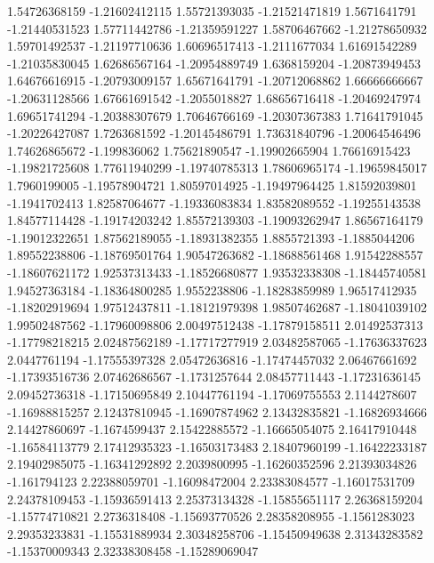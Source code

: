   1.54726368159   -1.21602412115
  1.55721393035   -1.21521471819
   1.5671641791   -1.21440531523
  1.57711442786   -1.21359591227
  1.58706467662   -1.21278650932
  1.59701492537   -1.21197710636
  1.60696517413    -1.2111677034
  1.61691542289   -1.21035830045
  1.62686567164   -1.20954889749
   1.6368159204   -1.20873949453
  1.64676616915   -1.20793009157
  1.65671641791   -1.20712068862
  1.66666666667   -1.20631128566
  1.67661691542    -1.2055018827
  1.68656716418   -1.20469247974
  1.69651741294   -1.20388307679
  1.70646766169   -1.20307367383
  1.71641791045   -1.20226427087
   1.7263681592   -1.20145486791
  1.73631840796   -1.20064546496
  1.74626865672     -1.199836062
  1.75621890547   -1.19902665904
  1.76616915423   -1.19821725608
  1.77611940299   -1.19740785313
  1.78606965174   -1.19659845017
   1.7960199005   -1.19578904721
  1.80597014925   -1.19497964425
  1.81592039801    -1.1941702413
  1.82587064677   -1.19336083834
  1.83582089552   -1.19255143538
  1.84577114428   -1.19174203242
  1.85572139303   -1.19093262947
  1.86567164179   -1.19012322651
  1.87562189055   -1.18931382355
   1.8855721393    -1.1885044206
  1.89552238806   -1.18769501764
  1.90547263682   -1.18688561468
  1.91542288557   -1.18607621172
  1.92537313433   -1.18526680877
  1.93532338308   -1.18445740581
  1.94527363184   -1.18364800285
   1.9552238806   -1.18283859989
  1.96517412935   -1.18202919694
  1.97512437811   -1.18121979398
  1.98507462687   -1.18041039102
  1.99502487562   -1.17960098806
  2.00497512438   -1.17879158511
  2.01492537313   -1.17798218215
  2.02487562189   -1.17717277919
  2.03482587065   -1.17636337623
   2.0447761194   -1.17555397328
  2.05472636816   -1.17474457032
  2.06467661692   -1.17393516736
  2.07462686567    -1.1731257644
  2.08457711443   -1.17231636145
  2.09452736318   -1.17150695849
  2.10447761194   -1.17069755553
   2.1144278607   -1.16988815257
  2.12437810945   -1.16907874962
  2.13432835821   -1.16826934666
  2.14427860697    -1.1674599437
  2.15422885572   -1.16665054075
  2.16417910448   -1.16584113779
  2.17412935323   -1.16503173483
  2.18407960199   -1.16422233187
  2.19402985075   -1.16341292892
   2.2039800995   -1.16260352596
  2.21393034826     -1.161794123
  2.22388059701   -1.16098472004
  2.23383084577   -1.16017531709
  2.24378109453   -1.15936591413
  2.25373134328   -1.15855651117
  2.26368159204   -1.15774710821
   2.2736318408   -1.15693770526
  2.28358208955    -1.1561283023
  2.29353233831   -1.15531889934
  2.30348258706   -1.15450949638
  2.31343283582   -1.15370009343
  2.32338308458   -1.15289069047
